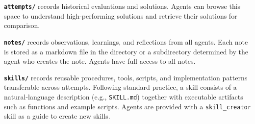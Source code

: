 

\textbf{\texttt{attempts/}} records historical evaluations and solutions. Agents can browse this space to understand high-performing solutions and retrieve their solutions for comparison.

\textbf{\texttt{notes/}} records observations, learnings, and reflections from all agents. Each note is stored as a markdown file in the directory or a subdirectory determined by the agent who creates the note. Agents have full access to all notes.

\textbf{\texttt{skills/}} records reusable procedures, tools, scripts, and implementation patterns transferable across attempts. Following standard practice, a skill consists of a natural-language description (e.g., \texttt{SKILL.md}) together with executable artifacts such as functions and example scripts. Agents are provided with a \texttt{skill\_creator} skill as a guide to create new skills.

